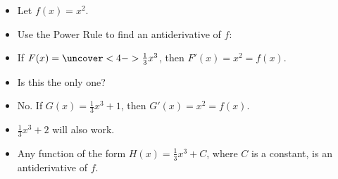 \begin{frame}
\begin{example}
\begin{itemize}
\item  Let $f(x) = x^2$.
\item<2-> Use the Power Rule to find an antiderivative of $f$:
\item<2-> If \alert<handout:0| 3-4>{$F(x) = \uncover<4->{\frac{1}{3}x^3}$}, then $F'(x) = x^2 = f(x)$.
\item<5-> Is this the only one?
\item<6-> No.  If $G(x) = \frac{1}{3}x^3 + 1$, then $G'(x) = x^2 = f(x)$.
\item<7-> $\frac{1}{3}x^3 + 2$ will also work.
\item<8-> Any function of the form $H(x) = \frac{1}{3}x^3 + C$, where $C$ is a constant, is an antiderivative of $f$.
\end{itemize}
\end{example}
\end{frame}
